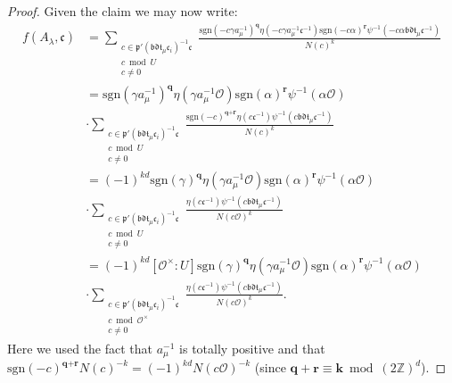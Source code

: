\documentclass[a4paper,oneside]{amsart}
\theoremstyle{plain}
\theoremstyle{definition}
\begin{document}
\begin{proof}
Given the claim we may now write: \begin{align*}f(A_{\lambda},\mathfrak{c}) &= \sum_{\substack{c\in\mathfrak{p'}(\mathfrak{bdt}_{\mu}\mathfrak{c}_i)^{-1}\mathfrak{c}\\ c \bmod U\\ c\neq 0}}\frac{\text{sgn}(-c\gamma a_{\mu}^{-1})^{\textbf{q}}\eta(-c\gamma a_{\mu}^{-1}\mathfrak{c}^{-1})\text{sgn}(-c\alpha)^{\textbf{r}}\psi^{-1}(-c\alpha\mathfrak{bdt}_{\mu}\mathfrak{c}^{-1})}{N(c)^k}\\ &= \text{sgn}(\gamma a_{\mu}^{-1})^{\textbf{q}}\eta(\gamma a_{\mu}^{-1}\mathcal{O})\text{sgn}(\alpha)^{\textbf{r}}\psi^{-1}(\alpha\mathcal{O})\\ &\cdot\sum_{\substack{c\in\mathfrak{p'}(\mathfrak{bdt}_{\mu}\mathfrak{c}_i)^{-1}\mathfrak{c}\\ c \bmod U\\ c\neq 0}}\frac{\text{sgn}(-c)^{\textbf{q}+\textbf{r}}\eta(c\mathfrak{c}^{-1})\psi^{-1}(c\mathfrak{bdt}_{\mu}\mathfrak{c}^{-1})}{N(c)^k}\\ &= (-1)^{kd}\text{sgn}(\gamma)^{\textbf{q}}\eta(\gamma a_{\mu}^{-1}\mathcal{O})\text{sgn}(\alpha)^{\textbf{r}}\psi^{-1}(\alpha\mathcal{O})\\ &\cdot\sum_{\substack{c\in\mathfrak{p'}(\mathfrak{bdt}_{\mu}\mathfrak{c}_i)^{-1}\mathfrak{c}\\ c \bmod U\\ c\neq 0}}\frac{\eta(c\mathfrak{c}^{-1})\psi^{-1}(c\mathfrak{bdt}_{\mu}\mathfrak{c}^{-1})}{N(c\mathcal{O})^k} \\ &=  (-1)^{kd}[\mathcal{O}^{\times}:U]\text{sgn}(\gamma)^{\textbf{q}}\eta(\gamma a_{\mu}^{-1}\mathcal{O})\text{sgn}(\alpha)^{\textbf{r}}\psi^{-1}(\alpha\mathcal{O})\\ &\cdot\sum_{\substack{c\in\mathfrak{p'}(\mathfrak{bdt}_{\mu}\mathfrak{c}_i)^{-1}\mathfrak{c}\\ c \bmod \mathcal{O}^{\times}\\ c\neq 0}}\frac{\eta(c\mathfrak{c}^{-1})\psi^{-1}(c\mathfrak{bdt}_{\mu}\mathfrak{c}^{-1})}{N(c\mathcal{O})^k}.\end{align*} Here we used the fact that $a_{\mu}^{-1}$ is totally positive and that $\text{sgn}(-c)^{\textbf{q}+\textbf{r}}N(c)^{-k} = (-1)^{kd}N(c\mathcal{O})^{-k}$ (since $\textbf{q}+\textbf{r} \equiv \textbf{k} \bmod (2\mathbb{Z})^d$).


\end{proof}
\end{document}
